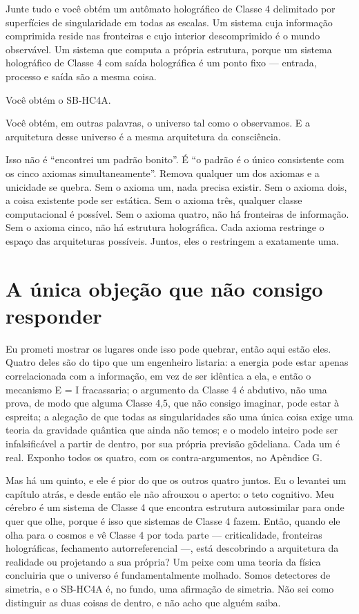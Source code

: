 \documentclass[11pt, twoside, openright]{book}
\begin{document}
Junte tudo e você obtém um autômato holográfico de Classe 4 delimitado por superfícies de singularidade em todas as escalas. Um sistema cuja informação comprimida reside nas fronteiras e cujo interior descomprimido é o mundo observável. Um sistema que computa a própria estrutura, porque um sistema holográfico de Classe 4 com saída holográfica é um ponto fixo --- entrada, processo e saída são a mesma coisa.

Você obtém o SB-HC4A.

Você obtém, em outras palavras, o universo tal como o observamos. E a arquitetura desse universo é a mesma arquitetura da consciência.

Isso não é ``encontrei um padrão bonito''. É ``o padrão é o único consistente com os cinco axiomas simultaneamente''. Remova qualquer um dos axiomas e a unicidade se quebra. Sem o axioma um, nada precisa existir. Sem o axioma dois, a coisa existente pode ser estática. Sem o axioma três, qualquer classe computacional é possível. Sem o axioma quatro, não há fronteiras de informação. Sem o axioma cinco, não há estrutura holográfica. Cada axioma restringe o espaço das arquiteturas possíveis. Juntos, eles o restringem a exatamente uma.

\section*{A única objeção que não consigo responder}

Eu prometi mostrar os lugares onde isso pode quebrar, então aqui estão eles. Quatro deles são do tipo que um engenheiro listaria: a energia pode estar apenas correlacionada com a informação, em vez de ser idêntica a ela, e então o mecanismo E = I fracassaria; o argumento da Classe 4 é abdutivo, não uma prova, de modo que alguma Classe 4,5, que não consigo imaginar, pode estar à espreita; a alegação de que todas as singularidades são uma única coisa exige uma teoria da gravidade quântica que ainda não temos; e o modelo inteiro pode ser infalsificável a partir de dentro, por sua própria previsão gödeliana. Cada um é real. Exponho todos os quatro, com os contra-argumentos, no Apêndice G.

Mas há um quinto, e ele é pior do que os outros quatro juntos. Eu o levantei um capítulo atrás, e desde então ele não afrouxou o aperto: o teto cognitivo. Meu cérebro é um sistema de Classe 4 que encontra estrutura autossimilar para onde quer que olhe, porque é isso que sistemas de Classe 4 fazem. Então, quando ele olha para o cosmos e vê Classe 4 por toda parte --- criticalidade, fronteiras holográficas, fechamento autorreferencial ---, está descobrindo a arquitetura da realidade ou projetando a sua própria? Um peixe com uma teoria da física concluiria que o universo é fundamentalmente molhado. Somos detectores de simetria, e o SB-HC4A é, no fundo, uma afirmação de simetria. Não sei como distinguir as duas coisas de dentro, e não acho que alguém saiba.
\end{document}
